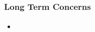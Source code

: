 \begin{frame}
  \frametitle{Long Term Concerns}
  \framesubtitle{}
  \begin{itemize}
    \item<1->

           {\scriptsize{}}

  \end{itemize}
\end{frame}
